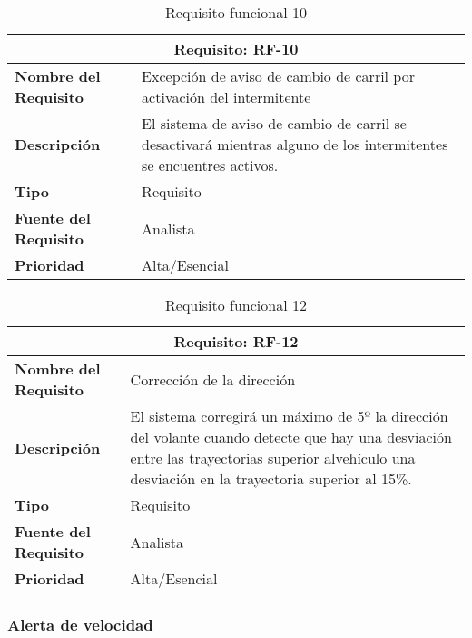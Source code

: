 \begin{table}[H]
\begin{center}
\begin{tabular}{p{} p{7cm}}
\multicolumn{2}{c}{\textbf{Requisito: RF-10} } \\
\hline \hline
\textbf{Nombre del Requisito} &  Excepción de aviso de cambio de carril por activación del intermitente\\
\hline
\textbf{Descripción} & El sistema de aviso de cambio de carril se desactivará mientras alguno de los intermitentes se encuentres activos. \\
\hline
\textbf{Tipo} & Requisito  \\
\hline
\textbf{Fuente del Requisito} & Analista  \\
\hline
\textbf{Prioridad} & Alta/Esencial  \\ \hline
\end{tabular}
\caption{Requisito funcional 10}
\label{tab:RF-10}
\end{center}
\end{table}

\begin{table}[H]
\begin{center}
\begin{tabular}{p{} p{7cm}}
\multicolumn{2}{c}{\textbf{Requisito: RF-12} } \\
\hline \hline
\textbf{Nombre del Requisito} &  Corrección de la dirección \\
\hline
\textbf{Descripción} & El sistema corregirá un máximo de 5º la dirección del volante cuando detecte que hay una desviación entre las trayectorias superior alvehículo una desviación en la trayectoria superior al 15\%. \\
\hline
\textbf{Tipo} & Requisito  \\
\hline
\textbf{Fuente del Requisito} & Analista  \\
\hline
\textbf{Prioridad} & Alta/Esencial  \\ \hline
\end{tabular}
\caption{Requisito funcional 12}
\label{tab:RF-12}
\end{center}
\end{table}

\newpage

\subsubsection{Alerta de velocidad}

